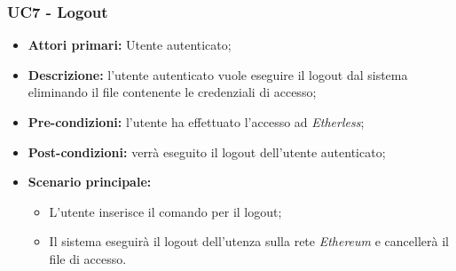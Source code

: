 \subsubsection{UC7 - Logout}
\begin{itemize}
	\item \textbf{Attori primari:} Utente autenticato;
	\item \textbf{Descrizione:} l'utente autenticato vuole eseguire il logout dal sistema eliminando il file contenente le credenziali di accesso; 
	\item \textbf{Pre-condizioni:} l'utente ha effettuato l'accesso ad \textit{Etherless};
	\item \textbf{Post-condizioni:} verrà eseguito il logout dell'utente autenticato;
	\item \textbf{Scenario principale:} 
	\begin{itemize}
		\item L'utente inserisce il comando per il logout;
		\item Il sistema eseguirà il logout dell'utenza sulla rete \textit{Ethereum\glos} e cancellerà il file di accesso.
	\end{itemize}
\end{itemize}